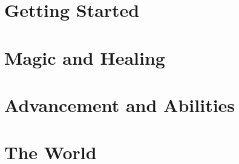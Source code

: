 \documentclass[12pt,oneside]{book}
\begin{document}


\tableofcontents
\cleardoublepage

\mainmatter

\part{Getting Started}
\clearpage
\clearpage
\clearpage

\part{Magic and Healing}
\clearpage
\clearpage

\part{Advancement and Abilities}
\clearpage
\clearpage
\clearpage
\clearpage
\clearpage
\clearpage

\part{The World}
\clearpage
\clearpage
\clearpage
\clearpage
\clearpage
\clearpage
\end{document}
